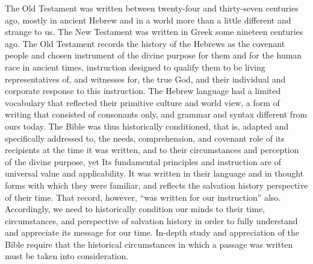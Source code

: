 The Old Testament was written between twenty-four and thirty-seven centuries
ago, mostly in ancient Hebrew and in a world more than a little different
and strange to us. The New Testament was written in Greek some nineteen
centuries ago. The Old Testament records the history of the Hebrews as the 
covenant people and chosen instrument of the divine purpose for them and for
the human race in ancient times, instruction designed to qualify them to be
living representatives of, and witnesses for, the true God, and their
individual and corporate response to this instruction. The Hebrew language
had a limited vocabulary that reflected their primitive culture and world
view, a form of writing that consisted of consonants only, and grammar and
syntax different from ours today.
\newpage
The Bible was thus historically conditioned,\cite{55} that is, adapted and
specifically addressed to, the needs, comprehension, and covenant role of
its recipients at the time it was written, and to their circumstances and
perception of the divine purpose, yet Its fundamental principles and
instruction are of universal value and applicability. It was written in
their language and in thought forms with which they were familiar, and
reflects the salvation history perspective of their time. That record,
however, ``was written for our instruction'' also. Accordingly, we need to
historically condition our minds to their time, circumstances, and
perspective of salvation history in order to fully understand and appreciate
its message for our time. In-depth study and appreciation of the Bible
require that the historical circumstances in which a passage was written
must be taken into consideration.

